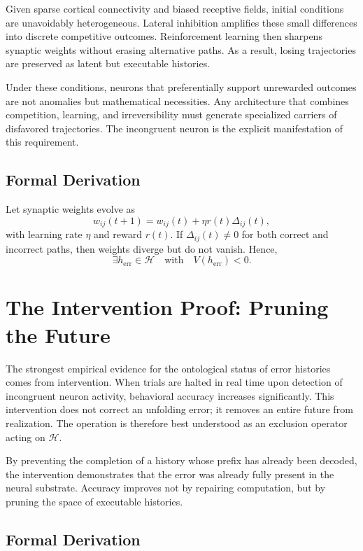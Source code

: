 \documentclass[11pt]{article}
\theoremstyle{plain}
\theoremstyle{definition}
\begin{document}
Given sparse cortical connectivity and biased receptive fields, initial conditions are unavoidably heterogeneous. Lateral inhibition amplifies these small differences into discrete competitive outcomes. Reinforcement learning then sharpens synaptic weights without erasing alternative paths. As a result, losing trajectories are preserved as latent but executable histories.

Under these conditions, neurons that preferentially support unrewarded outcomes are not anomalies but mathematical necessities. Any architecture that combines competition, learning, and irreversibility must generate specialized carriers of disfavored trajectories. The incongruent neuron is the explicit manifestation of this requirement.

\subsection*{Formal Derivation}

Let synaptic weights evolve as
\[
w_{ij}(t+1)=w_{ij}(t)+\eta r(t)\Delta_{ij}(t),
\]
with learning rate $\eta$ and reward $r(t)$. If $\Delta_{ij}(t)\neq 0$ for both correct and incorrect paths, then weights diverge but do not vanish. Hence,
\[
\exists h_{\mathrm{err}}\in\mathcal{H}\quad\text{with}\quad V(h_{\mathrm{err}})<0.
\]

\section{The Intervention Proof: Pruning the Future}

The strongest empirical evidence for the ontological status of error histories comes from intervention. When trials are halted in real time upon detection of incongruent neuron activity, behavioral accuracy increases significantly. This intervention does not correct an unfolding error; it removes an entire future from realization. The operation is therefore best understood as an exclusion operator acting on $\mathcal{H}$.

By preventing the completion of a history whose prefix has already been decoded, the intervention demonstrates that the error was already fully present in the neural substrate. Accuracy improves not by repairing computation, but by pruning the space of executable histories.

\subsection*{Formal Derivation}
\end{document}
